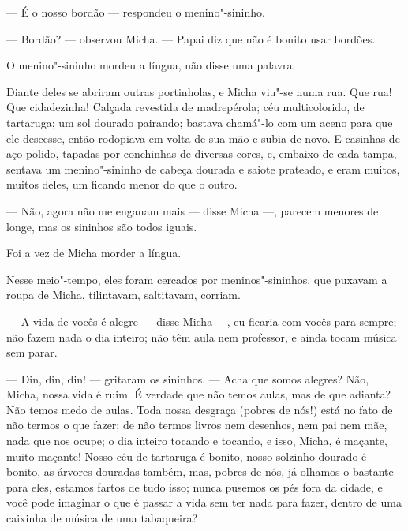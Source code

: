 --- É o nosso bordão --- respondeu o menino"-sininho.

--- Bordão? --- observou Micha. --- Papai diz que não é bonito usar
bordões.

O menino"-sininho mordeu a língua, não disse uma palavra.

Diante deles se abriram outras portinholas, e Micha viu"-se numa rua. Que
rua! Que cidadezinha! Calçada revestida de madrepérola; céu
multicolorido, de tartaruga; um sol dourado pairando; bastava
chamá"-lo com um aceno para que ele descesse, então rodopiava em volta de
sua mão e subia de novo. E casinhas de aço polido, tapadas por
conchinhas de diversas cores, e, embaixo de cada tampa, sentava um
menino"-sininho de cabeça dourada e saiote prateado, e eram muitos, muitos
deles, um ficando menor do que o outro.

--- Não, agora não me enganam mais --- disse Micha ---, parecem menores
de longe, mas os sininhos são todos iguais.


Foi a vez de Micha morder a língua.

Nesse meio"-tempo, eles foram cercados por meninos"-sininhos, que puxavam a
roupa de Micha, tilintavam, saltitavam, corriam.

--- A vida de vocês é alegre --- disse Micha ---, eu ficaria com vocês
para sempre; não fazem nada o dia inteiro; não têm aula nem professor, e
ainda tocam música sem parar.

--- Din, din, din! --- gritaram os sininhos. --- Acha que somos alegres?
Não, Micha, nossa vida é ruim. É verdade que não temos aulas, mas de que
adianta? Não temos medo de aulas. Toda nossa desgraça (pobres de nós!)
está no fato de não termos o que fazer; de não termos livros nem
desenhos, nem pai nem mãe, nada que nos ocupe; o dia inteiro tocando e
tocando, e isso, Micha, é maçante, muito maçante! Nosso céu de tartaruga
é bonito, nosso solzinho dourado é bonito, as árvores douradas também,
mas, pobres de nós, já olhamos o bastante para eles, estamos fartos de
tudo isso; nunca pusemos os pés fora da cidade, e você pode imaginar o
que é passar a vida sem ter nada para fazer, dentro de uma caixinha de
música de uma tabaqueira?

